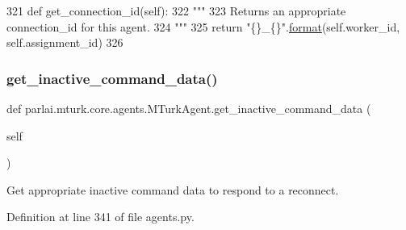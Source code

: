 \begin{DoxyCode}
321     \textcolor{keyword}{def }get\_connection\_id(self):
322         \textcolor{stringliteral}{"""}
323 \textcolor{stringliteral}{        Returns an appropriate connection\_id for this agent.}
324 \textcolor{stringliteral}{        """}
325         \textcolor{keywordflow}{return} \textcolor{stringliteral}{"\{\}\_\{\}"}.\hyperlink{namespaceparlai_1_1chat__service_1_1services_1_1messenger_1_1shared__utils_a32e2e2022b824fbaf80c747160b52a76}{format}(self.worker\_id, self.assignment\_id)
326 
\end{DoxyCode}
\mbox{\label{classparlai_1_1mturk_1_1core_1_1agents_1_1MTurkAgent_aa8b6eaf6532f10dabeb1ab8c3de98ec0}} 
\subsubsection{\texorpdfstring{get\+\_\+inactive\+\_\+command\+\_\+data()}{get\_inactive\_command\_data()}}
{\footnotesize\ttfamily def parlai.\+mturk.\+core.\+agents.\+M\+Turk\+Agent.\+get\+\_\+inactive\+\_\+command\+\_\+data (\begin{DoxyParamCaption}\item[{}]{self }\end{DoxyParamCaption})}

\begin{DoxyVerb}Get appropriate inactive command data to respond to a reconnect.
\end{DoxyVerb}
 

Definition at line 341 of file agents.\+py.


